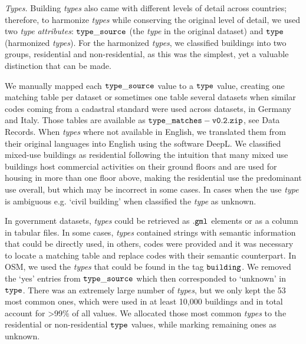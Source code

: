 \documentclass[fleqn,10pt]{wlscirep}
\begin{document}
\medskip \noindent \textit{Types.} \hspace{0.1cm} Building \textit{types} also came with different levels of detail across countries; therefore, to harmonize \textit{types} while conserving the original level of detail, we used two \textit{type} \textit{attributes}: $\tt{type\_source}$ (the \textit{type} in the original dataset) and $\tt{type}$ (harmonized \textit{types}). For the harmonized \textit{types}, we classified buildings into two groups, residential and non-residential, as this was the simplest, yet a valuable distinction that can be made. 

We manually mapped each $\tt{type\_source}$ value to a $\tt{type}$ value, creating one matching table per dataset or sometimes one table several datasets when similar codes coming from a cadastral standard were used across datasets, in Germany and Italy. Those tables are available as ${\tt type\_matches-v0.2.zip}$, see Data Records. When \textit{types} where not available in English, we translated them from their original languages into English using the software DeepL. We classified mixed-use buildings as residential following the intuition that many mixed use buildings host commercial activities on their ground floors and are used for housing in more than one floor above, making the residential use the predominant use overall, but which may be incorrect in some cases. In cases when the use \textit{type} is ambiguous e.g. `civil building' when classified the \textit{type} as unknown.

In government datasets, \textit{types} could be retrieved as $\tt{.gml}$ elements or as a column in tabular files. In some cases, \textit{types} contained strings with semantic information that could be directly used, in others, codes were provided and it was necessary to locate a matching table and replace codes with their semantic counterpart. In OSM, we used the \textit{types} that could be found in the tag $\tt{building}$. We removed the `yes' entries from $\tt{type\_source}$ which then corresponded to `unknown' in $\tt{type}$. There was an extremely large number of \textit{types}, but we only kept the 53 most common ones, which were used in at least 10,000 buildings and in total account for >99\% of all values. We allocated those most common \textit{types} to the residential or non-residential $\tt{type}$ values, while marking remaining ones as unknown.
\end{document}
